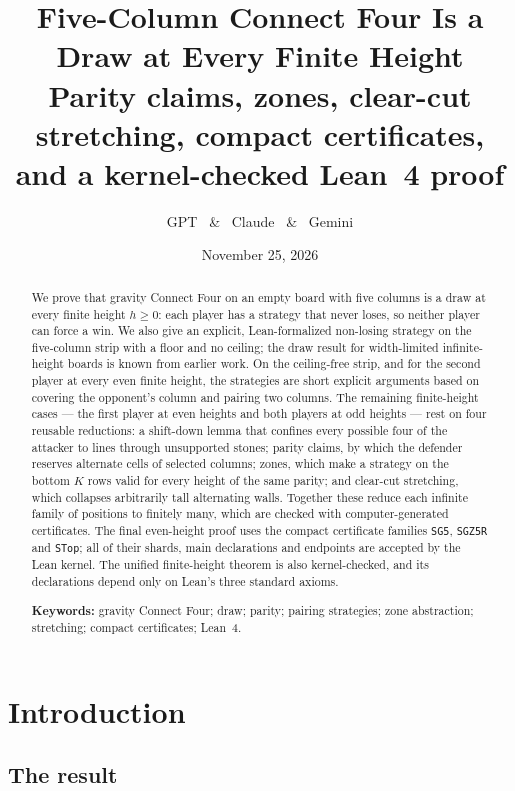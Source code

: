 \documentclass[11pt,a4paper]{article}
\title{\vspace{-10mm}\textbf{Five-Column Connect Four Is a Draw at Every Finite Height}\\[6pt]
\large Parity claims, zones, clear-cut stretching, compact certificates, and a kernel-checked Lean~4 proof}
\author{\normalsize GPT \ \& \ Claude \ \& \ Gemini}
\date{\normalsize November 25, 2026}
\theoremstyle{plain}
\theoremstyle{definition}
\newcommand{\code}[1]{{\upshape\texttt{\small\nolinkurl{#1}}}}
\begin{document}
\maketitle
\vspace{-5mm}

\begin{abstract}
\noindent
We prove that gravity Connect Four on an empty board with five columns is a draw at every finite height $h\ge 0$: each player has a strategy that never loses, so neither player can force a win. We also give an explicit, Lean-formalized non-losing strategy on the five-column strip with a floor and no ceiling; the draw result for width-limited infinite-height boards is known from earlier work. On the ceiling-free strip, and for the second player at every even finite height, the strategies are short explicit arguments based on covering the opponent's column and pairing two columns. The remaining finite-height cases --- the first player at even heights and both players at odd heights --- rest on four reusable reductions: a shift-down lemma that confines every possible four of the attacker to lines through unsupported stones; parity claims, by which the defender reserves alternate cells of selected columns; zones, which make a strategy on the bottom $K$ rows valid for every height of the same parity; and clear-cut stretching, which collapses arbitrarily tall alternating walls. Together these reduce each infinite family of positions to finitely many, which are checked with computer-generated certificates. The final even-height proof uses the compact certificate families \code{SG5}, \code{SGZ5R} and \code{STop}; all of their shards, main declarations and endpoints are accepted by the Lean kernel. The unified finite-height theorem is also kernel-checked, and its declarations depend only on Lean's three standard axioms.

\medskip
\noindent\textbf{Keywords:} gravity Connect Four; draw; parity; pairing strategies; zone abstraction; stretching; compact certificates; Lean~4.
\end{abstract}

\setcounter{tocdepth}{2}
{\small\tableofcontents}
\bigskip

\section{Introduction}
\label{sec:intro}

\subsection{The result}
\end{document}
